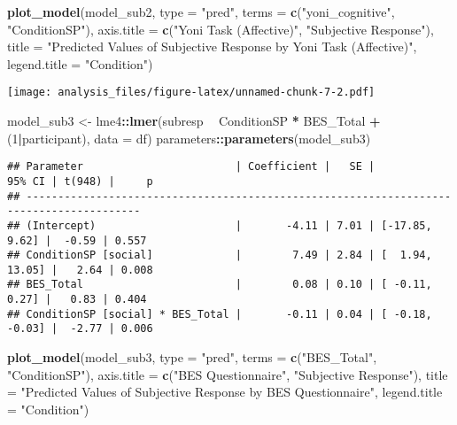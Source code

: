 \documentclass[
]{article}
\newenvironment{Shaded}{\begin{snugshade}}{\end{snugshade}}
\newcommand{\DataTypeTok}[1]{\textcolor[rgb]{0.13,0.29,0.53}{#1}}
\newcommand{\DecValTok}[1]{\textcolor[rgb]{0.00,0.00,0.81}{#1}}
\newcommand{\KeywordTok}[1]{\textcolor[rgb]{0.13,0.29,0.53}{\textbf{#1}}}
\newcommand{\NormalTok}[1]{#1}
\newcommand{\OperatorTok}[1]{\textcolor[rgb]{0.81,0.36,0.00}{\textbf{#1}}}
\newcommand{\StringTok}[1]{\textcolor[rgb]{0.31,0.60,0.02}{#1}}
\begin{document}
\begin{Shaded}
\begin{Highlighting}[]
\KeywordTok{plot_model}\NormalTok{(model_sub2, }\DataTypeTok{type =} \StringTok{"pred"}\NormalTok{, }\DataTypeTok{terms =} \KeywordTok{c}\NormalTok{(}\StringTok{"yoni_cognitive"}\NormalTok{, }\StringTok{"ConditionSP"}\NormalTok{), }\DataTypeTok{axis.title =} \KeywordTok{c}\NormalTok{(}\StringTok{"Yoni Task (Affective)"}\NormalTok{, }\StringTok{"Subjective Response"}\NormalTok{), }\DataTypeTok{title =} \StringTok{"Predicted Values of Subjective Response by Yoni Task (Affective)"}\NormalTok{, }\DataTypeTok{legend.title =} \StringTok{"Condition"}\NormalTok{)}
\end{Highlighting}
\end{Shaded}

\texttt{[image: analysis\_files/figure-latex/unnamed-chunk-7-2.pdf]}

\begin{Shaded}
\begin{Highlighting}[]
\NormalTok{model_sub3 <-}\StringTok{ }\NormalTok{lme4}\OperatorTok{::}\KeywordTok{lmer}\NormalTok{(subresp }\OperatorTok{~}\StringTok{ }\NormalTok{ConditionSP }\OperatorTok{*}\StringTok{ }\NormalTok{BES_Total }\OperatorTok{+}\StringTok{ }\NormalTok{(}\DecValTok{1}\OperatorTok{|}\NormalTok{participant), }\DataTypeTok{data =}\NormalTok{ df)}
\NormalTok{parameters}\OperatorTok{::}\KeywordTok{parameters}\NormalTok{(model_sub3)}
\end{Highlighting}
\end{Shaded}

\begin{verbatim}
## Parameter                        | Coefficient |   SE |          95% CI | t(948) |     p
## ----------------------------------------------------------------------------------------
## (Intercept)                      |       -4.11 | 7.01 | [-17.85,  9.62] |  -0.59 | 0.557
## ConditionSP [social]             |        7.49 | 2.84 | [  1.94, 13.05] |   2.64 | 0.008
## BES_Total                        |        0.08 | 0.10 | [ -0.11,  0.27] |   0.83 | 0.404
## ConditionSP [social] * BES_Total |       -0.11 | 0.04 | [ -0.18, -0.03] |  -2.77 | 0.006
\end{verbatim}

\begin{Shaded}
\begin{Highlighting}[]
\KeywordTok{plot_model}\NormalTok{(model_sub3, }\DataTypeTok{type =} \StringTok{"pred"}\NormalTok{, }\DataTypeTok{terms =} \KeywordTok{c}\NormalTok{(}\StringTok{"BES_Total"}\NormalTok{, }\StringTok{"ConditionSP"}\NormalTok{), }\DataTypeTok{axis.title =} \KeywordTok{c}\NormalTok{(}\StringTok{"BES Questionnaire"}\NormalTok{, }\StringTok{"Subjective Response"}\NormalTok{), }\DataTypeTok{title =} \StringTok{"Predicted Values of Subjective Response by BES Questionnaire"}\NormalTok{, }\DataTypeTok{legend.title =} \StringTok{"Condition"}\NormalTok{)}
\end{Highlighting}
\end{Shaded}
\end{document}
